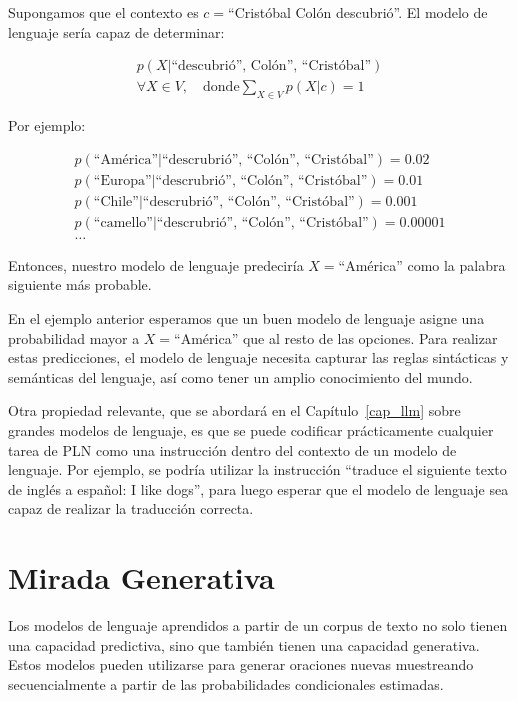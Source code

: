 \begin{example}
Supongamos que el contexto es $c=$``Cristóbal Colón descubrió''. El modelo de lenguaje sería capaz de determinar:

\begin{align*}
p(X|\text{``descubrió'', Colón'', ``Cristóbal''}) \\
\forall X \in V, \quad \text{donde} \sum_{X\in V}p(X|c)=1 
\end{align*}

Por ejemplo:

 
\begin{align*}
p(\text{``América''}|\text{``descrubrió'', ``Colón'', ``Cristóbal''}) = 0.02 \\
p(\text{``Europa''}|\text{``descrubrió'', ``Colón'', ``Cristóbal''}) = 0.01 \\
p(\text{``Chile''}|\text{``descrubrió'', ``Colón'', ``Cristóbal''}) = 0.001\\
p(\text{``camello''}|\text{``descrubrió'', ``Colón'', ``Cristóbal''}) = 0.00001 \\
\ldots
\end{align*}

Entonces, nuestro modelo de lenguaje predeciría $X=$``América'' como la palabra siguiente más probable.  
\end{example}

En el ejemplo anterior esperamos que un buen modelo de lenguaje asigne una probabilidad mayor a $X=$``América'' que al resto de las opciones. Para realizar estas predicciones, el modelo de lenguaje necesita capturar las reglas sintácticas y semánticas del lenguaje, así como tener un amplio conocimiento del mundo. 


Otra propiedad relevante, que se abordará en el Capítulo~\ref{cap_llm} sobre grandes modelos de lenguaje, es que se puede codificar prácticamente cualquier tarea de PLN como una instrucción dentro del contexto de un modelo de lenguaje. Por ejemplo, se podría utilizar la instrucción ``traduce el siguiente texto de inglés a español: I like dogs'', para luego esperar que el modelo de lenguaje sea capaz de realizar la traducción correcta.

\section{Mirada Generativa}

Los modelos de lenguaje aprendidos a partir de un corpus de texto no solo tienen una capacidad predictiva, sino que también tienen una capacidad generativa. Estos modelos pueden utilizarse para generar oraciones nuevas muestreando secuencialmente a partir de las probabilidades condicionales estimadas.

